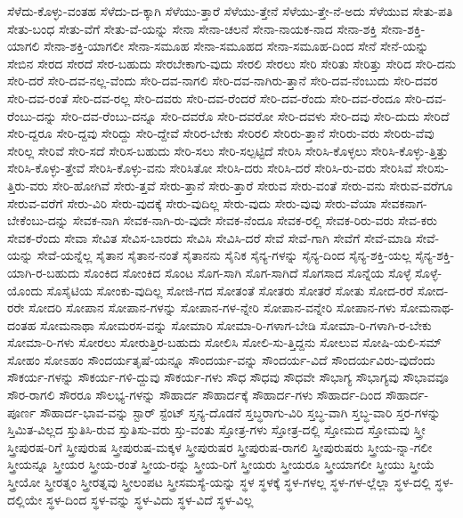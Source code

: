 {ಸೆಳೆದು-ಕೊಳ್ಳು-ವಂತಹ
ಸೆಳೆದು-ದ-ಕ್ಕಾಗಿ
ಸೆಳೆಯು-ತ್ತಾರೆ
ಸೆಳೆಯು-ತ್ತೇನೆ
ಸೆಳೆಯು-ತ್ತೇ-ನೆ-ಅದು
ಸೆಳೆಯುವ
ಸೇತು-ಪತಿ
ಸೇತು-ಬಂಧ
ಸೇತು-ವೆಗೆ
ಸೇತು-ವೆ-ಯನ್ನು
ಸೇನಾ
ಸೇನಾ-ಚಲನೆ
ಸೇನಾ-ನಾಯಕ-ನಾದ
ಸೇನಾ-ಶಕ್ತಿ
ಸೇನಾ-ಶಕ್ತಿ-ಯಾಗಲಿ
ಸೇನಾ-ಶಕ್ತಿ-ಯಾಗಲೀ
ಸೇನಾ-ಸಮೂಹ
ಸೇನಾ-ಸಮೂಹದ
ಸೇನಾ-ಸಮೂಹ-ದಿಂದ
ಸೇನೆ
ಸೇನೆ-ಯನ್ನು
ಸೇಬಿನ
ಸೇರದ
ಸೇರದೆ
ಸೇರ-ಬಹುದು
ಸೇರಬೇಕಾಗು-ವುದು
ಸೇರಲಿ
ಸೇರಲು
ಸೇರಿ
ಸೇರಿತು
ಸೇರಿತ್ತು
ಸೇರಿದ
ಸೇರಿ-ದನು
ಸೇರಿ-ದರೆ
ಸೇರಿ-ದವ-ನಲ್ಲ-ವೆಂದು
ಸೇರಿ-ದವ-ನಾಗಲಿ
ಸೇರಿ-ದವ-ನಾಗಿರು-ತ್ತಾನೆ
ಸೇರಿ-ದವ-ನೆಂಬುದು
ಸೇರಿ-ದವರ
ಸೇರಿ-ದವ-ರಂತೆ
ಸೇರಿ-ದವ-ರಲ್ಲ
ಸೇರಿ-ದವರು
ಸೇರಿ-ದವ-ರೆಂದರೆ
ಸೇರಿ-ದವ-ರೆಂದು
ಸೇರಿ-ದವ-ರೆಂದೂ
ಸೇರಿ-ದವ-ರೆಂಬು-ದನ್ನು
ಸೇರಿ-ದವ-ರೆಂಬು-ದನ್ನೂ
ಸೇರಿ-ದವರೊ
ಸೇರಿ-ದವರೋ
ಸೇರಿ-ದವಳು
ಸೇರಿ-ದವು
ಸೇರಿ-ದುದು
ಸೇರಿದೆ
ಸೇರಿ-ದ್ದರೂ
ಸೇರಿ-ದ್ದವು
ಸೇರಿದ್ದು
ಸೇರಿ-ದ್ದೇವೆ
ಸೇರಿರ-ಬೇಕು
ಸೇರಿರಲಿ
ಸೇರಿರು-ತ್ತಾನೆ
ಸೇರಿರು-ವರು
ಸೇರಿರು-ವೆವು
ಸೇರಿಲ್ಲ
ಸೇರಿವೆ
ಸೇರಿ-ಸದೆ
ಸೇರಿಸ-ಬಹುದು
ಸೇರಿ-ಸಲು
ಸೇರಿ-ಸಲ್ಪಟ್ಟಿದೆ
ಸೇರಿಸಿ
ಸೇರಿಸಿ-ಕೊಳ್ಳಲು
ಸೇರಿಸಿ-ಕೊಳ್ಳು-ತ್ತಿತ್ತು
ಸೇರಿಸಿ-ಕೊಳ್ಳು-ತ್ತೇವೆ
ಸೇರಿಸಿ-ಕೊಳ್ಳು-ವನು
ಸೇರಿಸಿತೋ
ಸೇರಿಸಿ-ದರು
ಸೇರಿಸಿ-ದರೆ
ಸೇರಿಸಿ-ರು-ವರು
ಸೇರಿಸಿವೆ
ಸೇರಿಸು-ತ್ತಿರು-ವರು
ಸೇರಿ-ಹೋಗಿವೆ
ಸೇರು-ತ್ತವೆ
ಸೇರು-ತ್ತಾನೆ
ಸೇರು-ತ್ತಾರೆ
ಸೇರುವ
ಸೇರು-ವಂತೆ
ಸೇರು-ವನು
ಸೇರುವ-ವರೆಗೂ
ಸೇರುವ-ವರೆಗೆ
ಸೇರು-ವಿರಿ
ಸೇರು-ವುದಕ್ಕೆ
ಸೇರು-ವುದಿಲ್ಲ
ಸೇರು-ವುದು
ಸೇರು-ವುವು
ಸೇರು-ವೆಯಾ
ಸೇವಕನಾಗ-ಬೇಕೆಂಬು-ದನ್ನು
ಸೇವಕ-ನಾಗಿ
ಸೇವಕ-ನಾಗಿ-ರು-ವುದೇ
ಸೇವಕ-ನೆಂದೂ
ಸೇವಕ-ರಲ್ಲಿ
ಸೇವಕ-ರಿರು-ವರು
ಸೇವ-ಕರು
ಸೇವಕ-ರೆಂದು
ಸೇವಾ
ಸೇವಿತ
ಸೇವಿಸ-ಬಾರದು
ಸೇವಿಸಿ
ಸೇವಿಸಿ-ದರೆ
ಸೇವೆ
ಸೇವೆ-ಗಾಗಿ
ಸೇವೆಗೆ
ಸೇವೆ-ಮಾಡಿ
ಸೇವೆ-ಯನ್ನು
ಸೇವೆ-ಯನ್ನೆಲ್ಲ
ಸೈತಾನ
ಸೈತಾನ-ನಂತೆ
ಸೈತಾನನು
ಸೈನಿಕ
ಸೈನ್ಯ-ಗಳನ್ನು
ಸೈನ್ಯ-ದಿಂದ
ಸೈನ್ಯ-ಶಕ್ತಿ-ಯಲ್ಲ
ಸೈನ್ಯ-ಶಕ್ತಿ-ಯಾಗಿ-ರ-ಬಹುದು
ಸೊಂಕಿದ
ಸೋಂಕಿದ
ಸೊಂಟ
ಸೊಗ-ಸಾಗಿ
ಸೊಗ-ಸಾಗಿದೆ
ಸೊಗಸಾದ
ಸೊನ್ನೆಯ
ಸೊಳ್ಳೆ
ಸೊಳ್ಳೆ-ಯೊಂದು
ಸೊಸೈಟಿಯ
ಸೋಂಕು-ವುದಿಲ್ಲ
ಸೋಜಿ-ಗದ
ಸೋತಂತೆ
ಸೋತರು
ಸೋತರೆ
ಸೋತು
ಸೋದ-ರರೆ
ಸೋದ-ರರೇ
ಸೋದರಿ
ಸೋಪಾನ
ಸೋಪಾನ-ಗಳನ್ನು
ಸೋಪಾನ-ಗಳ-ನ್ನೇರಿ
ಸೋಪಾನ-ವನ್ನೇರಿ
ಸೋಪಾನ-ಗಳು
ಸೋಮನಾಥ-ದಂತಹ
ಸೋಮನಾಥಾ
ಸೋಮರಸ-ವನ್ನು
ಸೋಮಾರಿ
ಸೋಮಾ-ರಿ-ಗಳಾಗ-ಬೇಡಿ
ಸೋಮಾ-ರಿ-ಗಳಾಗಿ-ರ-ಬೇಕು
ಸೋಮಾ-ರಿ-ಗಳು
ಸೋರಲು
ಸೋರುತ್ತಿರ-ಬಹುದು
ಸೋಲಿಸಿ
ಸೋಲಿ-ಸು-ತ್ತಿದ್ದನು
ಸೋಲುವ
ಸೋಷಿ-ಯಲಿ-ಸಮ್
ಸೋಹಂ
ಸೋಽಹಂ
ಸೌಂದರ್ಯತೃಷೆ-ಯನ್ನೂ
ಸೌಂದರ್ಯ-ವನ್ನು
ಸೌಂದರ್ಯ-ವಿದೆ
ಸೌಂದರ್ಯವಿರು-ವುದೆಂದು
ಸೌಕರ್ಯ-ಗಳನ್ನು
ಸೌಕರ್ಯ-ಗಳಿ-ದ್ದುವು
ಸೌಕರ್ಯ-ಗಳು
ಸೌಧ
ಸೌಧವು
ಸೌಧವೇ
ಸೌಭಾಗ್ಯ
ಸೌಭಾಗ್ಯವು
ಸೌಭಾವವೂ
ಸೌರ-ರಾಗಲಿ
ಸೌರರೂ
ಸೌಲಭ್ಯ-ಗಳನ್ನು
ಸೌಹಾರ್ದ
ಸೌಹಾರ್ದಕ್ಕೆ
ಸೌಹಾರ್ದ-ಗಳು
ಸೌಹಾರ್ದ-ದಿಂದ
ಸೌಹಾರ್ದ-ಪೂರ್ಣ
ಸೌಹಾರ್ದ-ಭಾವ-ವನ್ನು
ಸ್ಟಾರ್
ಸ್ಟೆಂಟ್
ಸ್ತನ್ಯ-ದೊಡನೆ
ಸ್ತಬ್ಧರಾಗು-ವಿರಿ
ಸ್ತಬ್ಧ-ವಾಗಿ
ಸ್ತಬ್ಧ-ವಾರಿ
ಸ್ತರ-ಗಳನ್ನು
ಸ್ತಿಮಿತ-ವಿಲ್ಲದ
ಸ್ತುತಿಸಿ-ರುವ
ಸ್ತುತಿಸು-ವರು
ಸ್ತು-ವಂತು
ಸ್ತೋತ್ರ-ಗಳು
ಸ್ತೋತ್ರ-ದಲ್ಲಿ
ಸ್ತೋಮದ
ಸ್ತೋಮವು
ಸ್ತ್ರೀ
ಸ್ತ್ರೀಪುರಷ-ರಿಗೆ
ಸ್ತ್ರೀಪುರುಷ
ಸ್ತ್ರೀಪುರುಷ-ಮಕ್ಕಳ
ಸ್ತ್ರೀಪುರುಷರ
ಸ್ತ್ರೀಪುರುಷ-ರಾಗಲಿ
ಸ್ತ್ರೀಪುರುಷರು
ಸ್ತ್ರೀಯ-ನ್ನಾ-ಗಲೀ
ಸ್ತ್ರೀಯನ್ನೂ
ಸ್ತ್ರೀಯರ
ಸ್ತ್ರೀಯ-ರಂತೆ
ಸ್ತ್ರೀಯ-ರನ್ನು
ಸ್ತ್ರೀಯ-ರಿಗೆ
ಸ್ತ್ರೀಯರು
ಸ್ತ್ರೀಯರೂ
ಸ್ತ್ರೀಯಾಗಲೀ
ಸ್ತ್ರೀಯು
ಸ್ತ್ರೀಯೆ
ಸ್ತ್ರೀಯೋ
ಸ್ತ್ರೀರತ್ನಂ
ಸ್ತ್ರೀರತ್ನವು
ಸ್ತ್ರೀಲಂಪಟ
ಸ್ತ್ರೀಸಮಸ್ಯೆ-ಯನ್ನು
ಸ್ಥಳ
ಸ್ಥಳಕ್ಕೆ
ಸ್ಥಳ-ಗಳಲ್ಲ
ಸ್ಥಳ-ಗಳ-ಲ್ಲೆಲ್ಲಾ
ಸ್ಥಳ-ದಲ್ಲಿ
ಸ್ಥಳ-ದಲ್ಲಿಯೇ
ಸ್ಥಳ-ದಿಂದ
ಸ್ಥಳ-ವನ್ನು
ಸ್ಥಳ-ವಿದು
ಸ್ಥಳ-ವಿದೆ
ಸ್ಥಳ-ವಿಲ್ಲ
}
